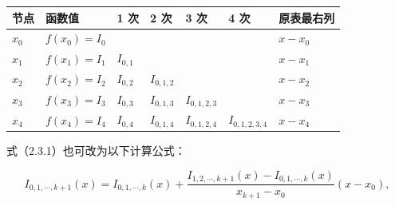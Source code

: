 \documentclass[
  10pt,
  fontset=fandol]{ctexart}
\newcounter{none} %
\begin{document}
{\def\LTcaptype{none} %
\begin{longtable}[]{@{}
  >{\raggedright\arraybackslash}p{}
  >{\raggedright\arraybackslash}p{}
  >{\raggedright\arraybackslash}p{}
  >{\raggedright\arraybackslash}p{}
  >{\raggedright\arraybackslash}p{}
  >{\raggedright\arraybackslash}p{}
  >{\raggedright\arraybackslash}p{}@{}}
\toprule\noalign{}
\begin{minipage}[b]{\linewidth}\raggedright
节点
\end{minipage} & \begin{minipage}[b]{\linewidth}\raggedright
函数值
\end{minipage} & \begin{minipage}[b]{\linewidth}\raggedright
1 次
\end{minipage} & \begin{minipage}[b]{\linewidth}\raggedright
2 次
\end{minipage} & \begin{minipage}[b]{\linewidth}\raggedright
3 次
\end{minipage} & \begin{minipage}[b]{\linewidth}\raggedright
4 次
\end{minipage} & \begin{minipage}[b]{\linewidth}\raggedright
原表最右列
\end{minipage} \\
\midrule\noalign{}
\endhead
\bottomrule\noalign{}
\endlastfoot
\(x_0\) & \(f(x_0)=I_0\) & & & & & \(x-x_0\) \\
\(x_1\) & \(f(x_1)=I_1\) & \(I_{0,1}\) & & & & \(x-x_1\) \\
\(x_2\) & \(f(x_2)=I_2\) & \(I_{0,2}\) & \(I_{0,1,2}\) & & & \(x-x_2\) \\
\(x_3\) & \(f(x_3)=I_3\) & \(I_{0,3}\) & \(I_{0,1,3}\) & \(I_{0,1,2,3}\) & & \(x-x_3\) \\
\(x_4\) & \(f(x_4)=I_4\) & \(I_{0,4}\) & \(I_{0,1,4}\) & \(I_{0,1,2,4}\) & \(I_{0,1,2,3,4}\) & \(x-x_4\) \\
\end{longtable}
}

式（2.3.1）也可改为以下计算公式：

\[
I_{0,1,\cdots,k+1}(x)
=I_{0,1,\cdots,k}(x)
+\frac{I_{1,2,\cdots,k+1}(x)-I_{0,1,\cdots,k}(x)}
{x_{k+1}-x_0}(x-x_0),
\tag{2.3.2}
\]
\end{document}
